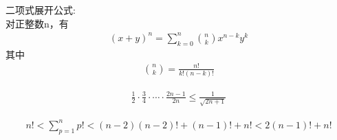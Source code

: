 \documentclass{article}
\begin{document}
\begin{zremark}
    二项式展开公式: \\
    对正整数n，有
    \begin{align*}
        (x + y)^n = \sum\limits_{k = 0}^n \binom{n}{k} x^{n - k} y^k
    \end{align*}
    其中
    \begin{align*}
        \binom{n}{k} = \frac{n!}{k!(n - k)!}
    \end{align*}
\end{zremark}

\begin{zremark}
    \begin{align*}
        \frac{1}{2} \cdot \frac{3}{4} \cdot \cdots \cdot \frac{2n - 1}{2n} \leq \frac{1}{\sqrt{2n + 1}}
    \end{align*}
\end{zremark}

\begin{zremark}
    \begin{align*}
        n ! < \sum \limits_{p = 1}^n p !
        < (n - 2)(n-2)! + (n - 1)! + n!
        < 2(n - 1)! + n !
    \end{align*}
\end{zremark}
\end{document}

